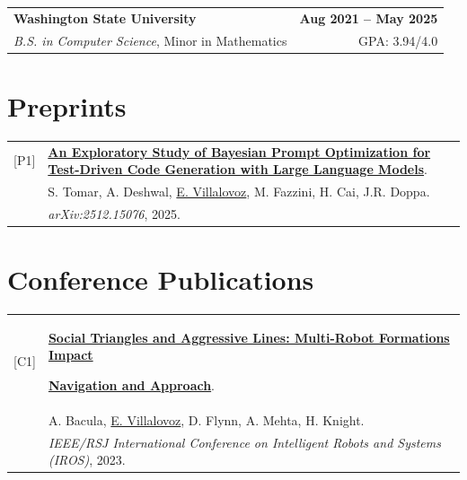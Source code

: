 \documentclass[margin,line]{res}
\begin{document}
\begin{resume}
\begin{tabularx}{\textwidth}{@{}X r@{}}
\textbf{Washington State University} & \textbf{Aug 2021 -- May 2025} \\
\emph{B.S. in Computer Science}, Minor in Mathematics & GPA: 3.94/4.0 \\
\end{tabularx}


\section{\sc Preprints}

\begin{tabularx}{\textwidth}{@{}l X@{}}
[P1] &
\href{https://arxiv.org/abs/2512.15076}{\textcolor{cvblue}{\textbf{An Exploratory Study of Bayesian Prompt Optimization for Test-Driven Code Generation with Large Language Models}}}. \\
& S. Tomar, A. Deshwal, \underline{E. Villalovoz}, M. Fazzini, H. Cai, J.R. Doppa. \\
& \emph{arXiv:2512.15076}, 2025. \\
\end{tabularx}


\section{\sc Conference Publications}

\begin{tabularx}{\textwidth}{@{}l X@{}}
[C1] &
\href{https://ethanvillalovoz.com/data/research/2023_OSU_Social_Triangles_and_Aggressive_Lines/2023_IROS_Social_Triangles_Agressive_Lines_bacula.pdf}{\textcolor{cvblue}{\textbf{Social Triangles and Aggressive Lines: Multi-Robot Formations Impact}}}

\href{https://ethanvillalovoz.com/data/research/2023_OSU_Social_Triangles_and_Aggressive_Lines/2023_IROS_Social_Triangles_Agressive_Lines_bacula.pdf}{\textcolor{cvblue}{\textbf{Navigation and Approach}}}. \\
& A. Bacula, \underline{E. Villalovoz}, D. Flynn, A. Mehta, H. Knight. \\
& \emph{IEEE/RSJ International Conference on Intelligent Robots and Systems (IROS)}, 2023. \\
\end{tabularx}


\end{resume}
\end{document}
